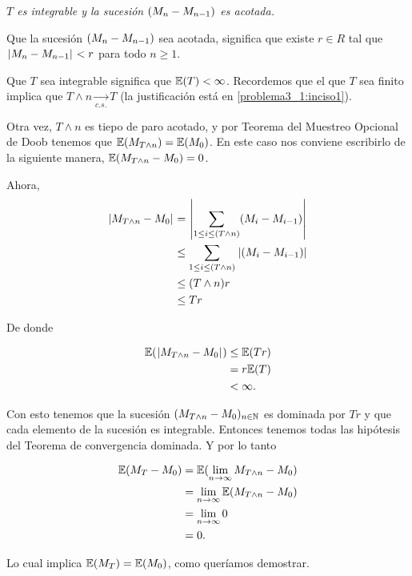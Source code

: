 \emph{
    $T$ es integrable y la sucesi\'on $\left( M_n-M_{n-1}\right) $ es acotada.
}

Que la sucesión $\left( M_n-M_{n-1}\right) $ sea acotada, significa que existe $r \in R$ tal que
$\hspace{.25mm}\left|M_n - M_{n-1}\right|\hspace{.25mm} < r$ para todo $n \geq 1$.\pn

Que $T$ sea integrable significa que $\mathbb{E}(T) < \infty$. Recordemos que el que $T$ sea finito implica que 
$T \wedge n \underset{c.s.}\longrightarrow T$ (la justificación está en \ref{problema3_1:inciso1}). \pn

Otra vez, $T \wedge n$ es tiepo de paro acotado, y por Teorema del Muestreo Opcional de Doob tenemos que 
$\mathbb{E}(M_{T \wedge n}) = \mathbb{E}(M_0)$. En este caso nos conviene escribirlo de la siguiente manera, 
$\mathbb{E}(M_{T \wedge n} - M_0) = 0$.\pn

Ahora, 
\begin{align}
    \hspace{.25mm}\left|M_{T \wedge n} - M_0\right|\hspace{.25mm}  &=      \hspace{.25mm}\left|\sum_{1 \leq i \leq (T \wedge n)} (M_i - M_{i-1})\right|\hspace{.25mm}     \\
                                &\leq   \sum_{1 \leq i \leq (T \wedge n)} \hspace{.25mm}\left|(M_i - M_{i-1})\right|\hspace{.25mm}     \\
                                &\leq   (T \wedge n) r                                              \\      
                                &\leq   T r                                                    
\end{align}

De donde 

\begin{align}
        \mathbb{E}(\hspace{.25mm}\left|M_{T \wedge n} - M_0\right|\hspace{.25mm})  &\leq   \mathbb{E}(T r) \\
                                        &= r \mathbb{E}(T)      \\
                                        &< \infty.
\end{align} \pn

Con esto tenemos que la sucesión $(M_{T \wedge n} - M_0)_{n \in \mathbb{N}}$ es dominada por $Tr$ y que cada 
elemento de la sucesión es integrable. Entonces tenemos todas las hipótesis del Teorema de convergencia dominada.
Y por lo tanto

\begin{align}
        \mathbb{E}(M_T - M_0)   &=  \mathbb{E}(\lim_{n \rightarrow \infty} M_{T \wedge n} - M_0)        \\
                        &=  \lim_{n \rightarrow \infty} \mathbb{E}(M_{T \wedge n} - M_0)        \\
                        &=  \lim_{n \rightarrow \infty} 0                               \\
                        &=  0.                        
\end{align}\pn

Lo cual implica $\mathbb{E}(M_T) = \mathbb{E}(M_0)$, como queríamos demostrar.